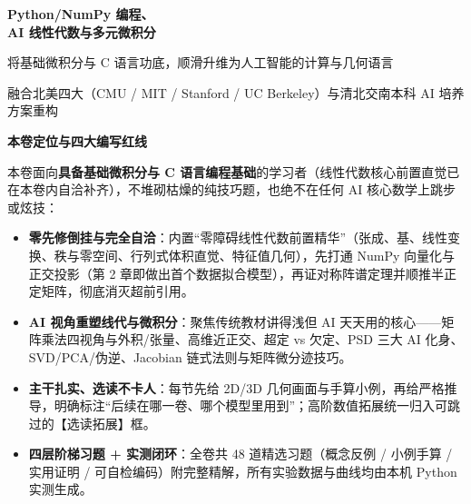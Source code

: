 \documentclass[UTF8,10.5pt,a4paper,oneside,fontset=fandol,scheme=plain]{ctexbook}
\begin{document}
\vspace*{1mm}
\vspace{1.5mm}
\noindent{\color{gold}\rule{30mm}{1.8pt}}{\color{tealLine}\rule{\dimexpr\linewidth-30mm\relax}{0.7pt}}
\vspace{6.5mm}

{\fontsize{24}{32}\selectfont\sffamily\bfseries\color{ink}Python/NumPy 编程、\\AI 线性代数与多元微积分}\par
\vspace{2.5mm}
{\large\sffamily\color{teal}将基础微积分与 C 语言功底，顺滑升维为人工智能的计算与几何语言}\par
\vspace{4.5mm}
{\small\color{slate}融合北美四大（CMU / MIT / Stanford / UC Berkeley）与清北交南本科 AI 培养方案重构}\par

\vspace{5.5mm}

\begin{tcolorbox}[
  enhanced,
  colback=tealLight,
  colframe=tealLine,
  arc=2mm,
  boxrule=0.6pt,
  left=4.5mm,right=4.5mm,top=3mm,bottom=3mm
]
\textbf{\sffamily\color{tealDark}本卷定位与四大编写红线}\par\vspace{1.2mm}
\small
本卷面向\textbf{具备基础微积分与 C 语言编程基础}的学习者（线性代数核心前置直觉已在本卷内自洽补齐），不堆砌枯燥的纯技巧题，也绝不在任何 AI 核心数学上跳步或炫技：
\begin{itemize}
  \item \textbf{零先修倒挂与完全自洽}：内置“零障碍线性代数前置精华”（张成、基、线性变换、秩与零空间、行列式体积直觉、特征值几何），先打通 NumPy 向量化与正交投影（第 2 章即做出首个数据拟合模型），再证对称阵谱定理并顺推半正定矩阵，彻底消灭超前引用。
  \item \textbf{AI 视角重塑线代与微积分}：聚焦传统教材讲得浅但 AI 天天用的核心——矩阵乘法四视角与外积/张量、高维近正交、超定 vs 欠定、PSD 三大 AI 化身、SVD/PCA/伪逆、Jacobian 链式法则与矩阵微分迹技巧。
  \item \textbf{主干扎实、选读不卡人}：每节先给 2D/3D 几何画面与手算小例，再给严格推导，明确标注“后续在哪一卷、哪个模型里用到”；高阶数值拓展统一归入可跳过的【选读拓展】框。
  \item \textbf{四层阶梯习题 + 实测闭环}：全卷共 48 道精选习题（概念反例 / 小例手算 / 实用证明 / 可自检编码）附完整精解，所有实验数据与曲线均由本机 Python 实测生成。
\end{itemize}
\end{tcolorbox}
\end{document}

